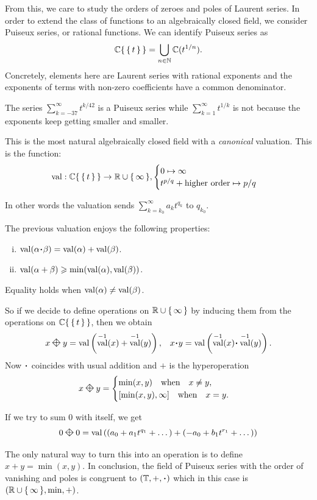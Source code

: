 \documentclass[12pt]{memoir}
\DeclareMathOperator{\val}{val}
\newcommand{\diamondplus}{\mathbin{\rotatebox[origin=c]{45}{$\boxtimes$}}} %
\begin{document}
From this, we care to study the orders of zeroes and poles of Laurent series. In order to extend the class of functions to an algebraically closed field, we consider Puiseux series, or rational functions. We can identify Puiseux series as 
$$\mathbb{C}\{\,\{\,t\,\}\,\}=\bigcup_{n\in\mathbb{N}}\mathbb{C}(t^{1/n}).$$
Concretely, elements here are Laurent series with rational exponents and the exponents of terms with non-zero coefficients have a common denominator. 
\begin{Ex}
    The series $\sum_{k=-37}^{\infty}t^{k/42}$ is a Puiseux series while $\sum_{k=1}^\infty t^{1/k}$ is not because the exponents keep getting smaller and smaller.
\end{Ex}
This is the most natural algebraically closed field with a \emph{canonical} valuation. This is the function:
$$\val: \bC\set{\set{t}}\to\bR\cup\set{\infty},\begin{cases}
    0\mapsto\infty\\
    t^{p/q}+\text{higher order}\mapsto p/q
\end{cases}$$

In other words the valuation sends $\sum_{k=k_0}^\infty a_kt^{q_k}$ to $q_{k_0}$.
\begin{Prop}
The previous valuation enjoys the following properties:
\begin{enumerate}[i)]
    \item $\val(\al\.\bt)=\val(\al)+\val(\bt)$.
    \item $\val(\al+\bt)\geq\min(\val(\al),\val(\bt))$.
\end{enumerate}
Equality holds when $\val(\al)\neq\val(\bt)$.
\end{Prop}
So if we decide to define operations on $\mathbb{R}\cup\{\,\infty\,\}$ by inducing them from the operations on $\mathbb{C}\{\,\{\,t\,\}\,\}$, then we obtain
\begin{align*}
    &x\diamondplus y=\val\left(\val^{-1}(x)+\val^{-1}(y)\right),
    &x\. y=\val\left(\val^{-1}(x)\.\val^{-1}(y)\right).
\end{align*}
Now $\.$ coincides with usual addition and $+$ is the hyperoperation
$$x\diamondplus y=\begin{cases}
    \min(x,y)\word{when}x\neq y,\\
    [\min(x,y),\infty]\word{when}x=y.
\end{cases}$$
\begin{Ex}
    If we try to sum $0$ with itself, we get 
    $$0\diamondplus 0=\val\left((a_0+a_1t^{q_1}+\dots)+(-a_0+b_1t^{r_1}+\dots)\right)$$
\end{Ex}
The only natural way to turn this into an operation is to define $x+y=\min(x,y)$. In conclusion, the field of Puiseux series with the order of vanishing and poles is congruent to $(\bT,+,\.)$ which in this case is $\left(\mathbb{R}\cup\{\,\infty\,\},\min,+\right)$.
\end{document}
